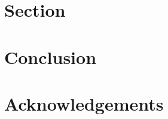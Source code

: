 \documentclass[conference]{IEEEtran}
\begin{document}
\section{Section}
\label{sec:n}
% 


\section{Conclusion}
\label{sec:conclusion}



\section*{Acknowledgements}
\label{sec:ack}





\end{document}
